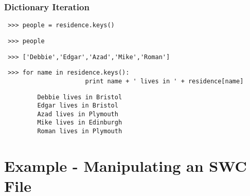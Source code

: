 \documentclass{beamer}
\begin{document}
\begin{frame}[fragile]
  
  \frametitle{Dictionary Iteration}

	  \begin{list}{\quad}{}
		  \footnotesize
		  \item<2-> \begin{verbatim} >>> people = residence.keys() \end{verbatim}	
		  \item<3-> \begin{verbatim} >>> people \end{verbatim}	
		  \item<4-> \begin{verbatim} >>> ['Debbie','Edgar','Azad','Mike','Roman']  \end{verbatim}	

		  \item<5-> \begin{verbatim} >>> for name in residence.keys():
	        		  print name + ' lives in ' + residence[name]
			  \end{verbatim}

		  \item<6-> \begin{verbatim} 
		 Debbie lives in Bristol
		 Edgar lives in Bristol
		 Azad lives in Plymouth
		 Mike lives in Edinburgh
		 Roman lives in Plymouth  \end{verbatim}	

	  \end{list}
 		  

\end{frame}



















\section{Example - Manipulating an SWC File}
\end{document}
